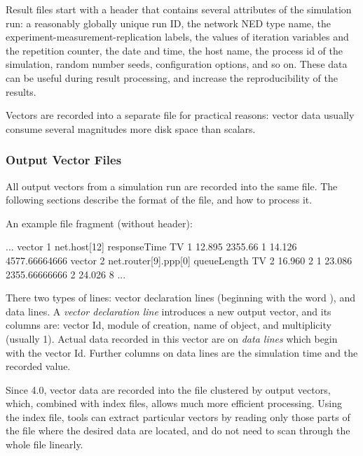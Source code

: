 Result files start with a header that contains several attributes of the
simulation run: a reasonably globally unique run ID, the network NED type
name, the experiment-measurement-replication labels, the values of
iteration variables and the repetition counter, the date and time, the host
name, the process id of the simulation, random number seeds, configuration
options, and so on. These data can be useful during result processing, and
increase the reproducibility of the results.


Vectors are recorded into a separate file for practical reasons: vector
data usually consume several magnitudes more disk space than scalars.


\subsubsection{Output Vector Files}
\label{sec:ana-sim:output-vector-files}

All output vectors from a simulation run are recorded into the same file.
The following sections describe the format of the file, and
how to process it.

An example file fragment (without header):

\begin{filelisting}
...
vector 1   net.host[12]  responseTime  TV
1  12.895  2355.66
1  14.126  4577.66664666
vector 2   net.router[9].ppp[0] queueLength  TV
2  16.960  2
1  23.086  2355.66666666
2  24.026  8
...
\end{filelisting}

There two types of lines: vector declaration lines (beginning with the word
), and data lines. A \textit{vector declaration line}
introduces a new output vector, and its columns are: vector Id, module of
creation, name of  object, and multiplicity (usually 1).
Actual data recorded in this vector are on \textit{data lines} which begin
with the vector Id. Further columns on data lines are the simulation time
and the recorded value.


Since {\opp} 4.0, vector data are recorded into the file clustered by
output vectors, which, combined with index files, allows much more
efficient processing. Using the index file, tools can extract particular
vectors by reading only those parts of the file where the desired data are
located, and do not need to scan through the whole file linearly.


